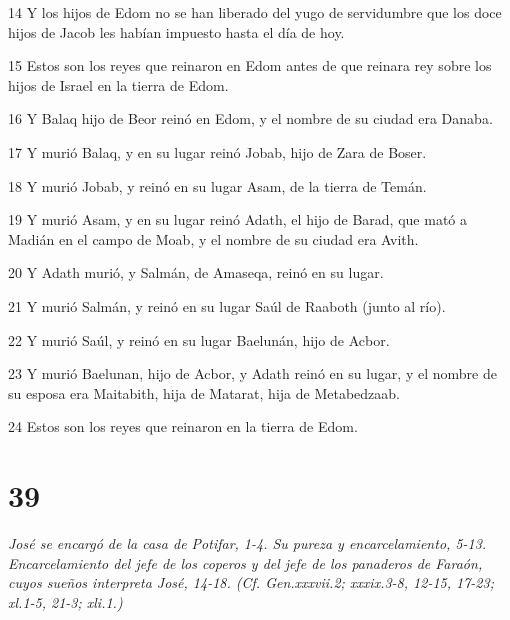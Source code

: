 \par 14 Y los hijos de Edom no se han liberado del yugo de servidumbre que los doce hijos de Jacob les habían impuesto hasta el día de hoy.
\par 15 Estos son los reyes que reinaron en Edom antes de que reinara rey sobre los hijos de Israel en la tierra de Edom.
\par 16 Y Balaq hijo de Beor reinó en Edom, y el nombre de su ciudad era Danaba.
\par 17 Y murió Balaq, y en su lugar reinó Jobab, hijo de Zara de Boser.
\par 18 Y murió Jobab, y reinó en su lugar Asam, de la tierra de Temán.
\par 19 Y murió Asam, y en su lugar reinó Adath, el hijo de Barad, que mató a Madián en el campo de Moab, y el nombre de su ciudad era Avith.
\par 20 Y Adath murió, y Salmán, de Amaseqa, reinó en su lugar.
\par 21 Y murió Salmán, y reinó en su lugar Saúl de Raaboth (junto al río).
\par 22 Y murió Saúl, y reinó en su lugar Baelunán, hijo de Acbor.
\par 23 Y murió Baelunan, hijo de Acbor, y Adath reinó en su lugar, y el nombre de su esposa era Maitabith, hija de Matarat, hija de Metabedzaab.
\par 24 Estos son los reyes que reinaron en la tierra de Edom.

\chapter{39}

\par \textit{José se encargó de la casa de Potifar, 1-4. Su pureza y encarcelamiento, 5-13. Encarcelamiento del jefe de los coperos y del jefe de los panaderos de Faraón, cuyos sueños interpreta José, 14-18. (Cf. Gen.xxxvii.2; xxxix.3-8, 12-15, 17-23; xl.1-5, 21-3; xli.1.)}

